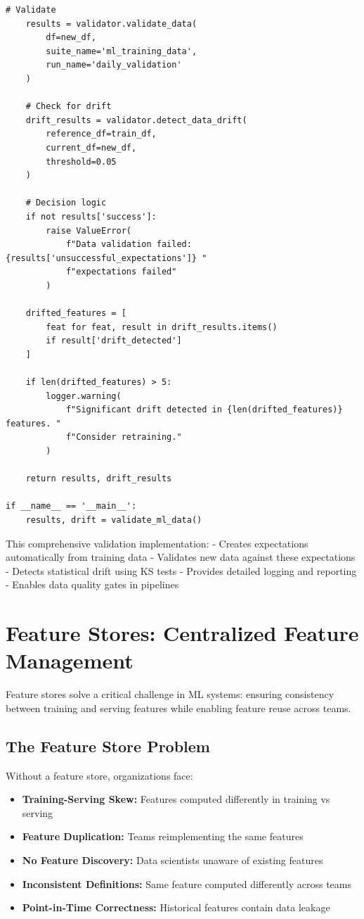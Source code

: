 \begin{lstlisting}[style=python, caption=Comprehensive Data Validation with Great Expectations]
    # Validate
    results = validator.validate_data(
        df=new_df,
        suite_name='ml_training_data',
        run_name='daily_validation'
    )

    # Check for drift
    drift_results = validator.detect_data_drift(
        reference_df=train_df,
        current_df=new_df,
        threshold=0.05
    )

    # Decision logic
    if not results['success']:
        raise ValueError(
            f"Data validation failed: {results['unsuccessful_expectations']} "
            f"expectations failed"
        )

    drifted_features = [
        feat for feat, result in drift_results.items()
        if result['drift_detected']
    ]

    if len(drifted_features) > 5:
        logger.warning(
            f"Significant drift detected in {len(drifted_features)} features. "
            f"Consider retraining."
        )

    return results, drift_results

if __name__ == '__main__':
    results, drift = validate_ml_data()
\end{lstlisting}

This comprehensive validation implementation:
- Creates expectations automatically from training data
- Validates new data against these expectations
- Detects statistical drift using KS tests
- Provides detailed logging and reporting
- Enables data quality gates in pipelines

\section{Feature Stores: Centralized Feature Management}

Feature stores solve a critical challenge in ML systems: ensuring consistency between training and serving features while enabling feature reuse across teams.

\subsection{The Feature Store Problem}

Without a feature store, organizations face:

\begin{itemize}
    \item \textbf{Training-Serving Skew:} Features computed differently in training vs serving
    \item \textbf{Feature Duplication:} Teams reimplementing the same features
    \item \textbf{No Feature Discovery:} Data scientists unaware of existing features
    \item \textbf{Inconsistent Definitions:} Same feature computed differently across teams
    \item \textbf{Point-in-Time Correctness:} Historical features contain data leakage
\end{itemize}

